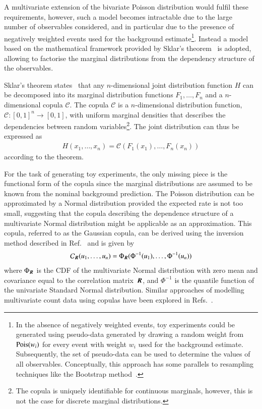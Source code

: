 A multivariate extension of the bivariate Poisson distribution would
fulfil these requirements, however, such a model becomes intractable
due to the large number of observables considered, and in particular
due to the presence of negatively weighted events used for the
background estimate\footnote{In the absence of negatively weighted
  events, toy experiments could be generated using pseudo-data
  generated by drawing a random weight from $\operatorname{Pois}(w_i)$ for every
  event with weight $w_i$ used for the background
  estimate. Subsequently, the set of pseudo-data can be used to
  determine the values of all observables. Conceptually, this approach
  has some parallels to resampling techniques like the Bootstrap
  method~\cite{10.1214/aos/1176344552,efron1994introduction}.}. Instead
a model based on the mathematical framework provided by Sklar's
theorem~\cite{Sklar1959FonctionsDR} is adopted, allowing to factorise
the marginal distributions from the dependency structure of the
observables.

Sklar's theorem states~\cite{nelsen} that any $n$-dimensional joint
distribution function $H$ can be decomposed into its marginal
distribution functions $F_1, \dots, F_n$ and a $n$-dimensional copula
$\mathcal{C}$. The copula $\mathcal{C}$ is a $n$-dimensional
distribution function, $\mathcal{C}: [0, 1]^n \rightarrow [0, 1]$,
with uniform marginal densities that describes the dependencies
between random variables\footnote{The copula is uniquely identifiable
  for continuous marginals, however, this is not the case for discrete
  marginal distributions.}. The joint distribution can thus be
expressed as
\begin{align*}
  H(x_1, \dots, x_n) = \mathcal{C}(F_1(x_1), \dots, F_n(x_n))
\end{align*}
according to the theorem.

For the task of generating toy experiments, the only missing piece is
the functional form of the copula since the marginal distributions are
assumed to be known from the nominal background prediction. The
Poisson distribution can be approximated by a Normal distribution
provided the expected rate is not too small, suggesting that the
copula describing the dependence structure of a multivariate Normal
distribution might be applicable as an approximation. This copula,
referred to as the Gaussian copula, can be derived using the inversion
method described in Ref.~\cite{nelsen} and is given by
\begin{align}
  \label{eq:gaussian_copula}
  \mathcal{C}_{\myvec{R}}(u_1, \dots, u_n) = \Phi_{\myvec{R}}(\Phi^{-1}(u_1), \dots, \Phi^{-1}(u_n))
\end{align}
where $\Phi_{\myvec{R}}$ is the CDF of the multivariate Normal
distribution with zero mean and covariance equal to the correlation
matrix~$\myvec{R}$, and $\Phi^{-1}$ is the quantile function of the
univariate Standard Normal distribution. Similar approaches of
modelling multivariate count data using copulas have been explored in
Refs.~\cite{10.1002/wics.1398}.

